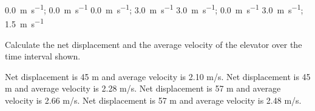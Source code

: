 \documentclass[answers]{exam}
\begin{document}
\begin{questions}
\begin{questions}
\begin{choices}
\choice \SI[per-mode=symbol]{0.0}{\meter\per\second}; \SI[per-mode=symbol]{0.0}{\meter\per\second}
\choice \SI[per-mode=symbol]{0.0}{\meter\per\second}; \SI[per-mode=symbol]{3.0}{\meter\per\second}
\CorrectChoice \SI[per-mode=symbol]{3.0}{\meter\per\second}; \SI[per-mode=symbol]{0.0}{\meter\per\second}
\choice \SI[per-mode=symbol]{3.0}{\meter\per\second}; \SI[per-mode=symbol]{1.5}{\meter\per\second}
\end{choices}

\question \label{ques:Unit02_Elevator2}

Calculate the net displacement and the average velocity of the elevator over the time interval shown.

\begin{choices}
\choice Net displacement is 45 m and average velocity is 2.10 m/s.
\choice Net displacement is 45 m and average velocity is 2.28 m/s.
\choice Net displacement is 57 m and average velocity is 2.66 m/s.
\CorrectChoice Net displacement is 57 m and average velocity is 2.48 m/s.
\end{choices}





\end{questions}







\end{questions}
\end{document}
